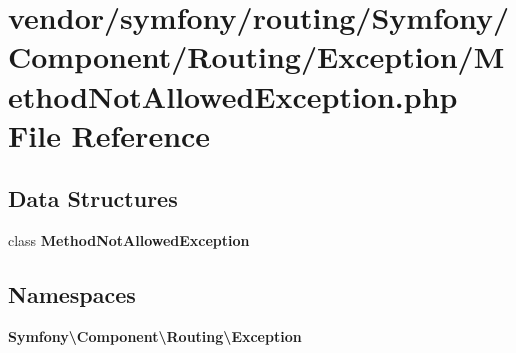 \section{vendor/symfony/routing/\+Symfony/\+Component/\+Routing/\+Exception/\+Method\+Not\+Allowed\+Exception.php File Reference}
\label{_method_not_allowed_exception_8php}
\subsection*{Data Structures}
\begin{DoxyCompactItemize}
\item 
class {\bf Method\+Not\+Allowed\+Exception}
\end{DoxyCompactItemize}
\subsection*{Namespaces}
\begin{DoxyCompactItemize}
\item 
 {\bf Symfony\textbackslash{}\+Component\textbackslash{}\+Routing\textbackslash{}\+Exception}
\end{DoxyCompactItemize}
